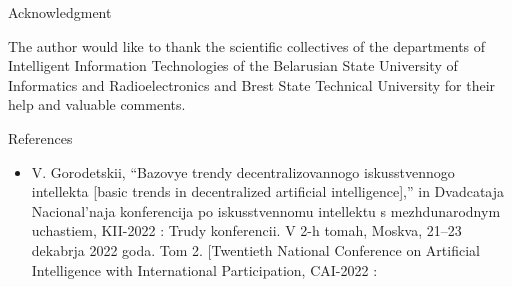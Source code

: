 \documentclass[9pt, letterpaper]{article}
\begin{document}
\begin{spacing}{0.97}
\begin{multicols}
\begin{center}
    Acknowledgment
\end{center}

The author would like to thank the scientific collectives of the departments of Intelligent Information Technologies of the Belarusian State University of Informatics
and Radioelectronics and Brest State Technical University
for their help and valuable comments.
\begin{center}
    References
\end{center}
\renewcommand{\labelitemi}{[1]}
\begin{itemize}
    \item V. Gorodetskii, “Bazovye trendy decentralizovannogo
iskusstvennogo intellekta [basic trends in decentralized artificial
intelligence],” in Dvadcataja Nacional’naja konferencija
po iskusstvennomu intellektu s mezhdunarodnym uchastiem,
KII-2022 : Trudy konferencii. V 2-h tomah, Moskva, 21–23
dekabrja 2022 goda. Tom 2. [Twentieth National Conference on
Artificial Intelligence with International Participation, CAI-2022 :
\end{itemize}
\end{multicols}
\end{spacing}
\end{document}

